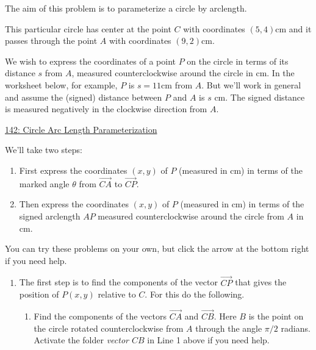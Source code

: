 \documentclass{ximera}
\begin{document}
\begin{question} \label{QWEercfe341}

The aim of this problem is to parameterize a circle by arclength.

This particular circle has center at the point $C$ with coordinates $(5,4)$cm and it passes through the point $A$ with coordinates $(9,2)$cm. 

We wish to express the coordinates of a point $P$ on the circle in terms of its distance $s$ from $A$, measured counterclockwise around the circle in cm. In the worksheet below, for example, $P$ is $s=11$cm from $A$. But we'll work in general and assume the (signed) distance between $P$ and $A$ is $s$ cm. The signed distance is measured negatively in the clockwise direction from $A$.

\begin{onlineOnly}
    \begin{center}
\end{center}
\end{onlineOnly}

\href{https://www.desmos.com/calculator/kuwm2chgyu}{142: Circle Arc Length Parameterization}


We'll take two steps:

\begin{enumerate}
\item First express the coordinates $(x,y)$ of $P$ (measured in cm) in terms of the marked angle $\theta$ from $\overrightarrow{CA}$ to $\overrightarrow{CP}$.

\item Then express the coordinates $(x,y)$ of $P$ (measured in cm) in terms of the signed arclength $AP$ measured counterclockwise around the circle from $A$ in cm. 
\end{enumerate}

You can try these problems on your own, but click the arrow at the bottom right if you need help.

\begin{expandable}

\begin{enumerate}
\item The first step is to find the components of the vector $\overrightarrow{CP}$ that gives the position of $P(x,y)$ relative to $C$. For this do the following.

\begin{enumerate}
\item Find the components of the vectors $\overrightarrow{CA}$ and $\overrightarrow{CB}$.  Here $B$ is the point on the circle rotated counterclockwise from $A$ through the angle $\pi/2$ radians. Activate the folder \emph{vector $CB$} in Line 1 above if you need help.


\end{enumerate}
\end{enumerate}
\end{expandable}
\end{question}
\end{document}
